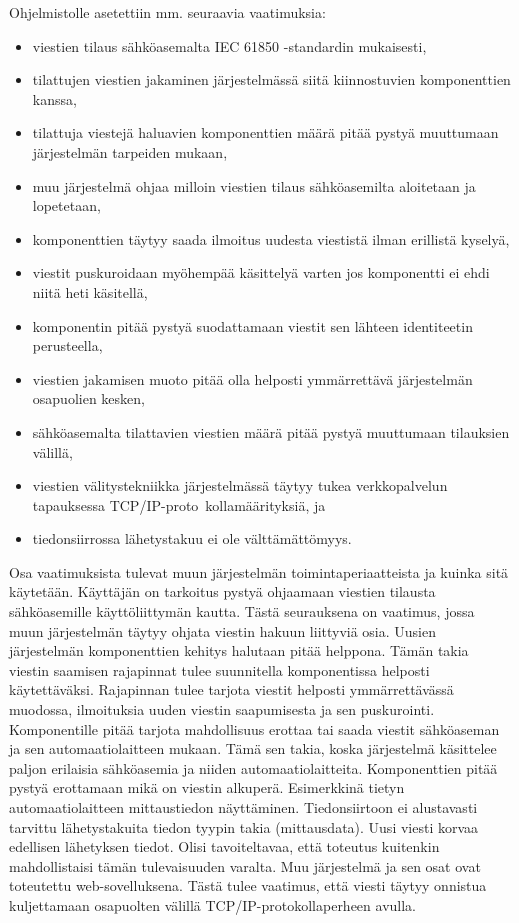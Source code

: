 Ohjelmistolle asetettiin mm. seuraavia vaatimuksia:
\begin{itemize}
	\item viestien tilaus sähköasemalta IEC 61850 -standardin mukaisesti,
	\item tilattujen viestien jakaminen järjestelmässä siitä kiinnostuvien komponenttien kanssa,
	\item tilattuja viestejä haluavien komponenttien määrä pitää pystyä muuttumaan järjestelmän tarpeiden mukaan,
	\item muu järjestelmä ohjaa milloin viestien tilaus sähköasemilta aloitetaan ja lopetetaan,
	\item komponenttien täytyy saada ilmoitus uudesta viestistä ilman erillistä kyselyä,
	\item viestit puskuroidaan myöhempää käsittelyä varten jos komponentti ei ehdi niitä heti käsitellä,
	\item komponentin pitää pystyä suodattamaan viestit sen lähteen identiteetin perusteella,
	\item viestien jakamisen muoto pitää olla helposti ymmärrettävä järjestelmän osapuolien kesken,
	\item sähköasemalta tilattavien viestien määrä pitää pystyä muuttumaan tilauksien välillä,
	\item viestien välitystekniikka järjestelmässä täytyy tukea verkkopalvelun tapauksessa TCP/IP-pro\-to \-kol\-la\-mää\-ri\-tyk\-si\-ä, ja
	\item tiedonsiirrossa lähetystakuu ei ole välttämättömyys.
\end{itemize}

Osa vaatimuksista tulevat muun järjestelmän toimintaperiaatteista ja kuinka sitä käytetään. Käyttäjän on tarkoitus pystyä ohjaamaan viestien tilausta sähköasemille käyttöliittymän kautta. Tästä seurauksena on vaatimus, jossa muun järjestelmän täytyy ohjata viestin hakuun liittyviä osia. Uusien järjestelmän komponenttien kehitys halutaan pitää helppona. Tämän takia viestin saamisen rajapinnat tulee suunnitella komponentissa helposti käytettäväksi. Rajapinnan tulee tarjota viestit helposti ymmärrettävässä muodossa, ilmoituksia uuden viestin saapumisesta ja sen puskurointi. Komponentille pitää tarjota mahdollisuus erottaa tai saada viestit sähköaseman ja sen automaatiolaitteen mukaan. Tämä sen takia, koska järjestelmä käsittelee paljon erilaisia sähköasemia ja niiden automaatiolaitteita. Komponenttien pitää pystyä erottamaan mikä on viestin alkuperä. Esimerkkinä tietyn automaatiolaitteen mittaustiedon näyttäminen. Tiedonsiirtoon ei alustavasti tarvittu lähetystakuita tiedon tyypin takia (mittausdata). Uusi viesti korvaa edellisen lähetyksen tiedot. Olisi tavoiteltavaa, että toteutus kuitenkin mahdollistaisi tämän tulevaisuuden varalta. Muu järjestelmä ja sen osat ovat toteutettu web-sovelluksena. Tästä tulee vaatimus, että viesti täytyy onnistua kuljettamaan osapuolten välillä TCP/IP-protokollaperheen avulla.


